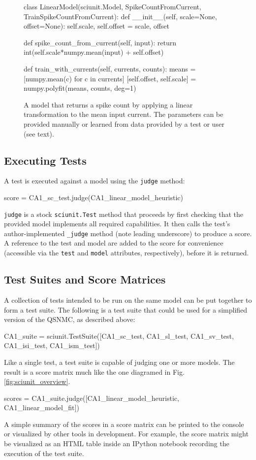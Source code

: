 \documentclass{frontiersSCNS}
\let\verbx\lstinline
\begin{document}
\begin{figure}
\begin{python}
class LinearModel(sciunit.Model, SpikeCountFromCurrent, 
    TrainSpikeCountFromCurrent):
  def __init__(self, scale=None, offset=None): 
    self.scale, self.offset = scale, offset
    
  def spike_count_from_current(self, input):
    return int(self.scale*numpy.mean(input) + self.offset)

  def train_with_currents(self, currents, counts):
    means = [numpy.mean(c) for c in currents]
    [self.offset, self.scale] = numpy.polyfit(means, counts, deg=1)    
\end{python}
\vspace{-15px}
\caption{A model that returns a spike count by applying a linear transformation to the mean input current. The parameters can be provided manually or learned from data provided by a test or user (see text).}
\label{fig:simple_model}
\vspace{-10px}
\end{figure}

\subsection{Executing Tests} A test is executed against a model using the \verbx{judge} method:
\begin{python}
score = CA1_sc_test.judge(CA1_linear_model_heuristic)
\end{python}

\verbx{judge} is a stock \verbx{sciunit.Test} method that proceeds by first checking that the provided model implements all required capabilities. It then calls the test's author-implemented \verbx{_judge} method (note leading underscore) to produce a score. A reference to the test and model are added to the score for convenience (accessible via the \verbx{test} and \verbx{model} attributes, respectively), before it is returned.

\subsection{Test Suites and Score Matrices} A collection of tests intended to be run on the same model can be put together to form a test suite.
The following is a test suite that could be used for a simplified version of the QSNMC, as described above:  
\begin{python}
CA1_suite = sciunit.TestSuite([CA1_sc_test, CA1_sl_test, CA1_sv_test, CA1_isi_test, CA1_ism_test])
\end{python}
Like a single test, a test suite is capable of judging one or more models. The result is a score matrix much like the one diagramed in Fig. \ref{fig:sciunit_overview}.
\begin{python}
scores = CA1_suite.judge([CA1_linear_model_heuristic, CA1_linear_model_fit])
\end{python}
A simple summary of the scores in a score matrix can be printed to the console or visualized by other tools in development.  For example, the score matrix might be visualized as an HTML table inside an IPython notebook recording the execution of the test suite.  
\end{document}
